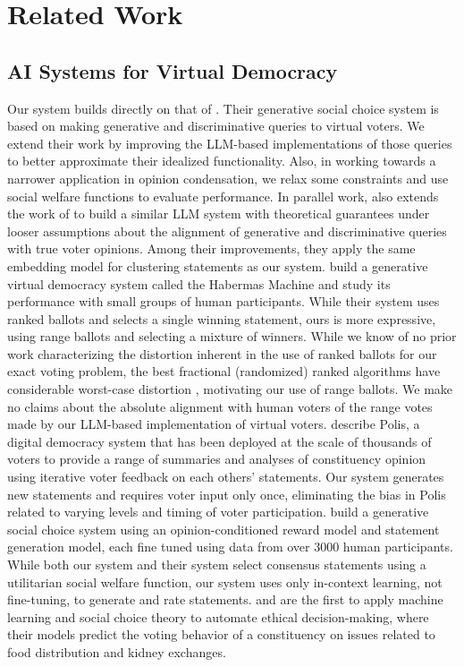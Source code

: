 \documentclass[11pt]{article}
\begin{document}
\section{Related Work}
\subsection{AI Systems for Virtual Democracy}
Our system builds directly on that of \citet{fish-v2}. Their generative social choice system is based on making generative and discriminative queries to virtual voters. We extend their work by improving the LLM-based implementations of those queries to better approximate their idealized functionality. Also, in working towards a narrower application in opinion condensation, we relax some constraints and use social welfare functions to evaluate performance. In parallel work, \citet{gsc-next-gen} also extends the work of \citet{fish-v2} to build a similar LLM system with theoretical guarantees under looser assumptions about the alignment of generative and discriminative queries with true voter opinions. Among their improvements, they apply the same embedding model for clustering statements as our system. \citet{habermas-machine} build a generative virtual democracy system called the Habermas Machine and study its performance with small groups of human participants. While their system uses ranked ballots and selects a single winning statement, ours is more expressive, using range ballots and selecting a mixture of winners. While we know of no prior work characterizing the distortion inherent in the use of ranked ballots for our exact voting problem, the best fractional (randomized) ranked algorithms have considerable worst-case distortion \citep{anshelevich-2017}, motivating our use of range ballots. We make no claims about the absolute alignment with human voters of the range votes made by our LLM-based implementation of virtual voters. \citet{polis} describe Polis, a digital democracy system that has been deployed at the scale of thousands of voters to provide a range of summaries and analyses of constituency opinion using iterative voter feedback on each others’ statements. Our system generates new statements and requires voter input only once, eliminating the bias in Polis related to varying levels and timing of voter participation. \citet{bakker-consensus} build a generative social choice system using an opinion-conditioned reward model and statement generation model, each fine tuned using data from over 3000 human participants. While both our system and their system select consensus statements using a utilitarian social welfare function, our system uses only in-context learning, not fine-tuning, to generate and rate statements. \citet{noothigattu-2018} and \citet{freedman-kidney-exchange} are the first to apply machine learning and social choice theory to automate ethical decision-making, where their models predict the voting behavior of a constituency on issues related to food distribution and kidney exchanges.
\end{document}
